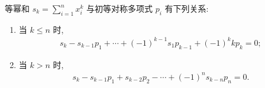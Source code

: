 \documentclass[../../main.tex]{subfiles}%
\begin{document}
\begin{theorem}[Newton 公式]\label{theorem:抽象代数--Newton公式}
等幂和 \( s_k = \sum_{i=1}^n x_i^k \) 与初等对称多项式 \( p_i \) 有下列关系:
\begin{enumerate}[(1)]
\item 当 \( k \leqslant n \) 时,
\begin{align}
s_k - s_{k-1} p_1 + \cdots + (-1)^{k-1} s_1 p_{k-1} + (-1)^k k p_k = 0; \label{eq:::::::::9r32r43vby4y6u56mn34top897i530-j3t43ywat 53hu4e2.3.3}
\end{align}
\item 当 \( k > n \) 时,
\begin{align}
s_k - s_{k-1} p_1 + s_{k-2} p_2 - \cdots + (-1)^n s_{k-n} p_n = 0. \label{eq:::::::::9r32r43vby4y6u56mn34top897i530-j3t43ywat 53hu4e2.3.4}
\end{align}
\end{enumerate}
\end{theorem}
\end{document}
